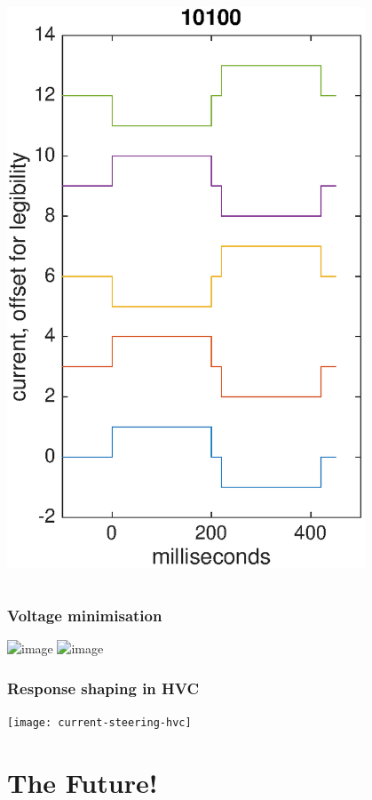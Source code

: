 \documentclass{beamer}
\begin{document}
\begin{frame}
\begin{columns}
\begin{center}
      \includegraphics[width=0.8\textwidth]{pulsedemo}
    \end{center}
  \end{columns}
\end{frame}

\begin{frame}
  \frametitle{Voltage minimisation}
  \includegraphics<+>[width=\textwidth]{current_steering_voltages}
  \includegraphics<+>[width=\textwidth]{current_steering_voltages_valid}
\end{frame}




\begin{frame}
  \frametitle{Response shaping in HVC}
  \begin{center}
    \texttt{[image: current-steering-hvc]}
  \end{center}
\end{frame}





\section{The Future!}
\end{document}
